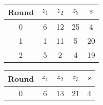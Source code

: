 \begin{table}
\begin{tabular}{c | c | c | c | c }
Round & $z_1$ & $z_2$ & $z_3$ & $s$ \\
\hline
0 & 6 & 12 & 25 & 4 \\
1 & 1 & 11 & 5 & 20 \\
2 & 5 & 2 & 4 & 19
\end{tabular}
\end{table}

\begin{table}
\begin{tabular}{c | c | c | c | c }
Round & $z_1$ & $z_2$ & $z_3$ & $s$ \\
\hline
0 & 6 & 13 & 21 & 4
\end{tabular}
\end{table}
